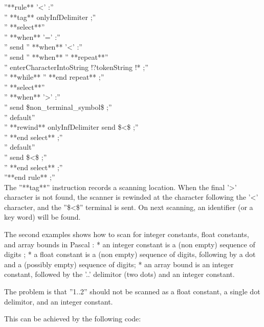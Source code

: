 ''**rule** '<' :''\\
'' **tag** onlyInfDelimiter ;''\\
'' **select**''\\
'' **when** '=' :''\\
'' send %
'' **when** '<' :''\\
''  send %
'' **when** %
''  **repeat**''\\
''   enterCharacterIntoString !?tokenString !* ;''\\
''  **while** %
''  **end repeat** ;''\\
''  **select**''\\
''  **when** '>' :''\\
''   send \$non\_terminal\_symbol\$ ;''\\
''  default''\\
''   **rewind** onlyInfDelimiter send \$<\$ ;''\\
''  **end select** ;''\\
'' default''\\
''  send \$<\$ ;''\\
'' **end select** ;''\\
''**end rule** ;''\\

The ''**tag**'' instruction records a scanning location. When the final '>' character is not found, the scanner is rewinded at the character following the '<' character, and the ''\$<\$'' terminal is sent. On next scanning, an identifier (or a key word) will be found.

The second examples shows how to scan for integer constants, float constants, and array bounds in Pascal :
  * an integer constant is a (non empty) sequence of digits ;
  * a float constant is a (non empty) sequence of digits, following by a dot and a (possibly empty) sequence of digits;
  * an array bound is an integer constant, followed by the '..' delimitor (two dots) and an integer constant.

The problem is that ''1..2'' should not be scanned as a float constant, a single dot delimitor, and an integer constant.

This can be achieved by the following code:

